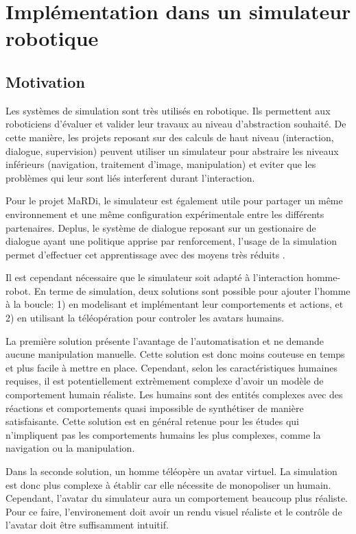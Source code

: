\documentclass[a4paper,11pt,twoside]{StyleThese}
\begin{document}
\section{Implémentation dans un simulateur robotique}

\subsection{Motivation}
Les systèmes de simulation sont très utilisés en robotique. Ils permettent aux roboticiens d'évaluer et valider leur travaux au niveau d'abstraction souhaité. De cette manière, les projets reposant sur des calculs de haut niveau (interaction, dialogue, supervision) peuvent utiliser un simulateur pour abstraire les niveaux inférieurs (navigation, traitement d'image, manipulation) et eviter que les problèmes qui leur sont liés interferent durant l'interaction.

Pour le projet MaRDi, le simulateur est également utile pour partager un même environnement et une même configuration expérimentale entre les différents partenaires. Deplus, le système de dialogue reposant sur un gestionaire de dialogue ayant une politique apprise par renforcement, l'usage de la simulation permet d'effectuer cet apprentissage avec des moyens très réduits \cite{simpar_2014}.

Il est cependant nécessaire que le simulateur soit adapté à l'interaction homme-robot. 
En terme de simulation, deux solutions sont possible pour ajouter l'homme à la boucle: 1) en modelisant et implémentant leur comportements et actions, et 2) en utilisant la téléopération pour controler les avatars humains.

La première solution présente l'avantage de l'automatisation et ne demande aucune manipulation manuelle. Cette solution est donc moins couteuse en temps et plus facile à mettre en place. Cependant, selon les caractéristiques humaines requises, il est potentiellement extrèmement complexe d'avoir un modèle de comportement humain réaliste. Les humains sont des entités complexes avec des réactions et comportements quasi impossible de synthétiser de manière satisfaisante. Cette solution est en général retenue pour les études qui n'impliquent pas les comportements humains les plus complexes, comme la navigation ou la manipulation.

Dans la seconde solution, un homme téléopère un avatar virtuel. La simulation est donc plus complexe à établir car elle nécessite de monopoliser un humain. Cependant, l'avatar du simulateur aura un comportement beaucoup plus réaliste. Pour ce faire, l'environement doit avoir un rendu visuel réaliste et le contrôle de l'avatar doit être suffisamment intuitif.
\end{document}
